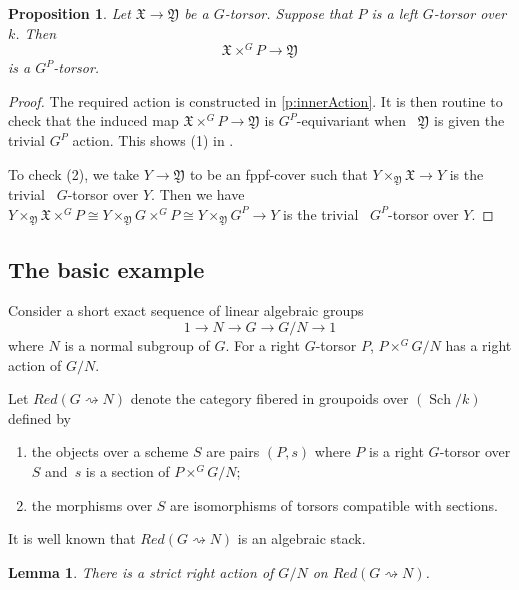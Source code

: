 \documentclass[12pt, final]{amsart}
\theoremstyle{remark}
\theoremstyle{definition}
\theoremstyle{plain}
\newtheorem{proposition}[example]{Proposition}
\newtheorem{lemma}[example]{Lemma}
\newcommand{\rsa}{\rightsquigarrow}
\newcommand{\fX}{{\mathfrak X}}
\newcommand{\fY}{{\mathfrak Y}}
\DeclareMathOperator{\sch}{Sch}
\begin{document}
\begin{proposition}
    Let $\fX \to \fY$ be a $G$-torsor. Suppose that $P$ is a left $G$-torsor over $k$. Then 
    $$
    \fX\times^{G}P \to \fY 
    $$
    is a $G^P$-torsor. 
\end{proposition}
\begin{proof}
   
    The required action is constructed in \ref{p:innerAction}.
It is then routine to check that the induced map 
    $\fX \times^G P \to \fY$ is $G^P$-equivariant when ~$\fY$ is given the
    trivial $G^P$ action. This shows (1) in .

    To check (2), we take $Y \to \fY$ to be 
    an fppf-cover such that $Y \times_\fY \fX \to Y$ is the trivial 
    ~$G$-torsor over $Y$. Then we have 
    $Y \times_\fY \fX \times^G P \cong Y \times_\fY G \times^G P \cong Y \times_\fY G^P \to Y$
    is the trivial ~$G^P$-torsor over $Y$. 
\end{proof}

\subsection{The basic example}
Consider a short exact sequence of linear algebraic groups
$$
1\to N \to G\to G/N\to 1 
$$ where $N$ is a normal subgroup of $G$.
For a right $G$-torsor $P$, $P\times^{G}G/N$ has a right action of $G/N$.

Let $Red(G\rsa N)$ denote the category fibered in groupoids over $\left(\sch/k\right)$ defined by 
\begin{enumerate}
    \item the objects over a scheme $S$ are pairs $(P,s)$ where $P$ is a right $G$-torsor over $S$ and~$s$ is a section of $P\times^{G}G/N$; 
    \item the morphisms over $S$ are isomorphisms of torsors compatible with sections. 
\end{enumerate}

It is well known that $Red(G\rsa N)$ is an algebraic stack.
\begin{lemma}
    There is a strict right action of $G/N$ on $Red(G\rsa N)$. 
\end{lemma}
\end{document}

